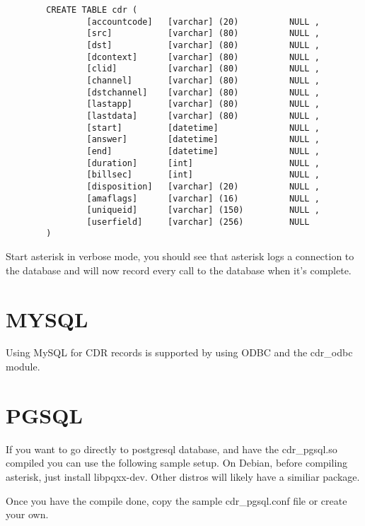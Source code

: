\begin{astlisting}
\begin{verbatim}
		CREATE TABLE cdr (
		        [accountcode]   [varchar] (20)          NULL ,
		        [src]           [varchar] (80)          NULL ,
		        [dst]           [varchar] (80)          NULL ,
		        [dcontext]      [varchar] (80)          NULL ,
		        [clid]          [varchar] (80)          NULL ,
		        [channel]       [varchar] (80)          NULL ,
		        [dstchannel]    [varchar] (80)          NULL ,
		        [lastapp]       [varchar] (80)          NULL ,
		        [lastdata]      [varchar] (80)          NULL ,
		        [start]         [datetime]              NULL ,
		        [answer]        [datetime]              NULL ,
		        [end]           [datetime]              NULL ,
		        [duration]      [int]                   NULL ,
		        [billsec]       [int]                   NULL ,
		        [disposition]   [varchar] (20)          NULL ,
		        [amaflags]      [varchar] (16)          NULL ,
		        [uniqueid]      [varchar] (150)         NULL ,
		        [userfield]     [varchar] (256)         NULL
		)
\end{verbatim}
\end{astlisting}
                Start asterisk in verbose mode, you should see that asterisk
                logs a connection to the database and will now record every
                call to the database when it's complete.


\section{MYSQL}

Using MySQL for CDR records is supported by using ODBC and the cdr\_odbc module.

\section{PGSQL}
        If you want to go directly to postgresql database, and have the cdr\_pgsql.so
        compiled you can use the following sample setup.
        On Debian, before compiling asterisk, just install libpqxx-dev.
        Other distros will likely have a similiar package.

        Once you have the compile done,
        copy the sample cdr\_pgsql.conf file or create your own.

